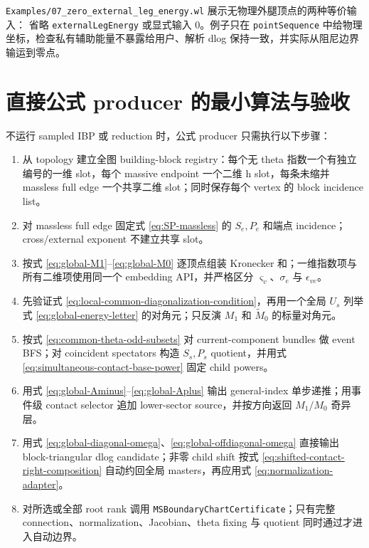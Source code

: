 \documentclass[11pt,a4paper]{ctexart}
\begin{document}
\texttt{Examples/07\_zero\_external\_leg\_energy.wl} 展示无物理外腿顶点的两种等价输入：
省略 \texttt{externalLegEnergy} 或显式输入 0。例子只在 \texttt{pointSequence} 中给物理
坐标，检查私有辅助能量不暴露给用户、解析 dlog 保持一致，并实际从阻尼边界输运到零点。

\section{直接公式 producer 的最小算法与验收}

不运行 sampled IBP 或 reduction 时，公式 producer 只需执行以下步骤：
\begin{enumerate}[label=\arabic*.]
  \item 从 topology 建立全图 building-block registry：每个无 theta 指数一个有独立编号的一维 slot，每个 massive endpoint 一个二维 h slot，每条未缩并 massless full edge 一个共享二维 slot；同时保存每个 vertex 的 block incidence list。
  \item 对 massless full edge 固定式 \eqref{eq:SP-massless} 的 $S_e,P_e$ 和端点 incidence；cross/external exponent 不建立共享 slot。
  \item 按式 \eqref{eq:global-M1}--\eqref{eq:global-M0} 逐顶点组装 Kronecker 和；一维指数项与所有二维项使用同一个 embedding API，并严格区分 $\varsigma_v$、$\sigma_e$ 与 $\epsilon_{ve}$。
  \item 先验证式 \eqref{eq:local-common-diagonalization-condition}，再用一个全局 $U_s$ 列举式 \eqref{eq:global-energy-letter} 的对角元；只反演 $M_1$ 和 $\widetilde M_0$ 的标量对角元。
  \item 按式 \eqref{eq:common-theta-odd-subsets} 对 current-component bundles 做 event BFS；对 coincident spectators 构造 $S_s,P_s$ quotient，并用式 \eqref{eq:simultaneous-contact-base-power} 固定 child powers。
  \item 用式 \eqref{eq:global-Aminus}--\eqref{eq:global-Aplus} 输出 general-index 单步递推；用事件级 contact selector 追加 lower-sector source，并按方向返回 $M_1/M_0$ 奇异层。
  \item 用式 \eqref{eq:global-diagonal-omega}、\eqref{eq:global-offdiagonal-omega} 直接输出 block-triangular dlog candidate；非零 child shift 按式 \eqref{eq:shifted-contact-right-composition} 自动约回全局 masters，再应用式 \eqref{eq:normalization-adapter}。
  \item 对所选或全部 root rank 调用 \texttt{MSBoundaryChartCertificate}；只有完整 connection、normalization、Jacobian、theta fixing 与 quotient 同时通过才进入自动边界。
\end{enumerate}
\end{document}
